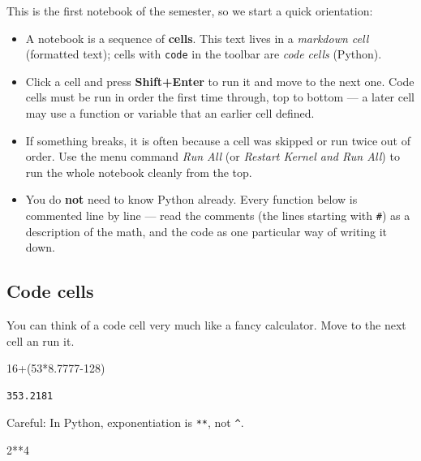 \documentclass[
  letterpaper,
  DIV=11,
  numbers=noendperiod]{scrreprt}
\newenvironment{Shaded}{\begin{snugshade}}{\end{snugshade}}
\newcommand{\DecValTok}[1]{\textcolor[rgb]{0.68,0.00,0.00}{#1}}
\newcommand{\FloatTok}[1]{\textcolor[rgb]{0.68,0.00,0.00}{#1}}
\newcommand{\NormalTok}[1]{\textcolor[rgb]{0.00,0.23,0.31}{#1}}
\newcommand{\OperatorTok}[1]{\textcolor[rgb]{0.37,0.37,0.37}{#1}}
\providecommand{\tightlist}{%
  \setlength{\itemsep}{0pt}\setlength{\parskip}{0pt}}
\theoremstyle{plain}
\theoremstyle{plain}
\theoremstyle{definition}
\theoremstyle{definition}
\theoremstyle{definition}
\theoremstyle{plain}
\theoremstyle{plain}
\theoremstyle{remark}
\begin{document}
This is the first notebook of the semester, so we start a quick
orientation:

\begin{itemize}
\tightlist
\item
  A notebook is a sequence of \textbf{cells}. This text lives in a
  \emph{markdown cell} (formatted text); cells with \texttt{code} in the
  toolbar are \emph{code cells} (Python).
\item
  Click a cell and press \textbf{Shift+Enter} to run it and move to the
  next one. Code cells must be run in order the first time through, top
  to bottom --- a later cell may use a function or variable that an
  earlier cell defined.
\item
  If something breaks, it is often because a cell was skipped or run
  twice out of order. Use the menu command \emph{Run All} (or
  \emph{Restart Kernel and Run All}) to run the whole notebook cleanly
  from the top.
\item
  You do \textbf{not} need to know Python already. Every function below
  is commented line by line --- read the comments (the lines starting
  with \texttt{\#}) as a description of the math, and the code as one
  particular way of writing it down.
\end{itemize}

\subsection{Code cells}\label{code-cells}

You can think of a code cell very much like a fancy calculator. Move to
the next cell an run it.

\begin{Shaded}
\begin{Highlighting}[]
\DecValTok{16}\OperatorTok{+}\NormalTok{(}\DecValTok{53}\OperatorTok{*}\FloatTok{8.7777}\OperatorTok{{-}}\DecValTok{128}\NormalTok{)}
\end{Highlighting}
\end{Shaded}

\begin{verbatim}
353.2181
\end{verbatim}

Careful: In Python, exponentiation is \texttt{**}, not \texttt{\^{}}.

\begin{Shaded}
\begin{Highlighting}[]
\DecValTok{2}\OperatorTok{**}\DecValTok{4}
\end{Highlighting}
\end{Shaded}
\end{document}
